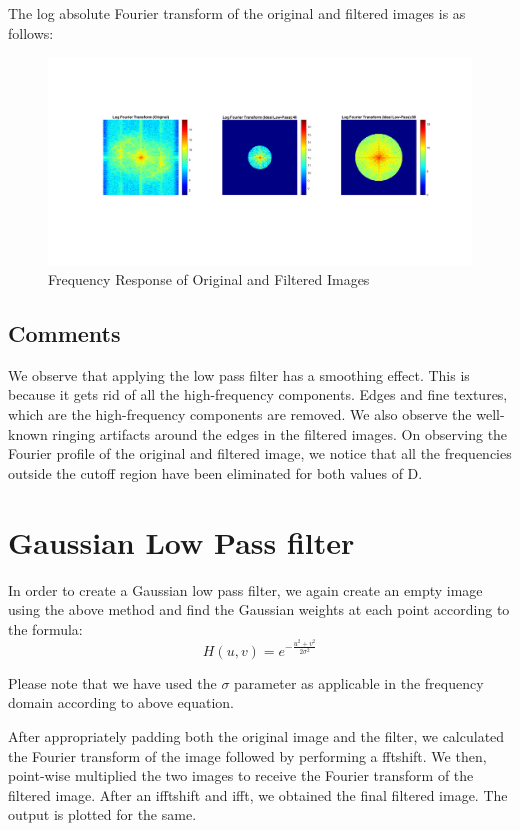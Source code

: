 \documentclass[a4paper]{article}
\begin{document}
The log absolute Fourier transform of the original and filtered images is as follows:
\begin{figure}[h]
    \centering
    \includegraphics[width=\linewidth]{img2.png}
    \caption{Frequency Response of Original and Filtered Images}
\end{figure}

\subsection{Comments}
We observe that applying the low pass filter has a smoothing effect. This is because it gets rid of all the high-frequency components. Edges and fine textures, which are the high-frequency components are removed. We also observe the well-known ringing artifacts around the edges in the filtered images.
On observing the Fourier profile of the original and filtered image, we notice that all the frequencies outside the cutoff region have been eliminated for both values of D.


\section{Gaussian Low Pass filter}
In order to create a Gaussian low pass filter, we again create an empty image using the above method and find the Gaussian weights at each point according to the formula:
\[ H(u,v) = e^{-\frac{u^2 +v^2}{2\sigma^2}}\]

Please note that we have used the $\sigma$ parameter as applicable in the frequency domain according to above equation.
 
After appropriately padding both the original image and the filter, we calculated the Fourier transform of the image followed by performing a fftshift.
We then, point-wise multiplied the two images to receive the Fourier transform of the filtered image. After an ifftshift and ifft, we obtained the final filtered image. The output is plotted for the same.
\end{document}
